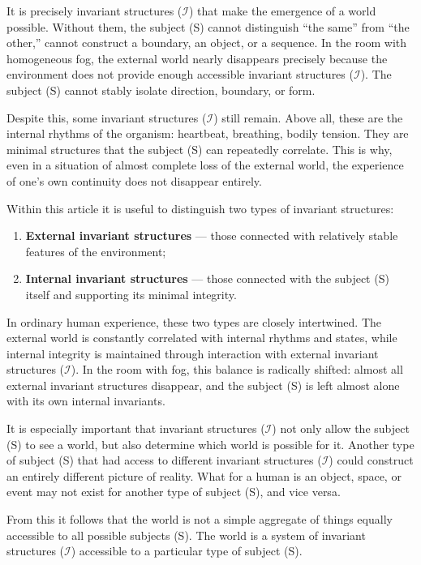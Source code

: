 \documentclass[aps,prd,onecolumn,nofootinbib,superscriptaddress]{revtex4-2} %
\begin{document}
    It is precisely invariant structures ($\mathcal{I}$) that make the emergence of a world possible. Without them, the subject (S) cannot distinguish “the same” from “the other,” cannot construct a boundary, an object, or a sequence. In the room with homogeneous fog, the external world nearly disappears precisely because the environment does not provide enough accessible invariant structures ($\mathcal{I}$). The subject (S) cannot stably isolate direction, boundary, or form.

    Despite this, some invariant structures ($\mathcal{I}$) still remain. Above all, these are the internal rhythms of the organism: heartbeat, breathing, bodily tension. They are minimal structures that the subject (S) can repeatedly correlate. This is why, even in a situation of almost complete loss of the external world, the experience of one’s own continuity does not disappear entirely.

    Within this article it is useful to distinguish two types of invariant structures:

    \begin{enumerate}
        \item \textbf{External invariant structures} --- those connected with relatively stable features of the environment;

        \item \textbf{Internal invariant structures} --- those connected with the subject (S) itself and supporting its minimal integrity.
    \end{enumerate}

    In ordinary human experience, these two types are closely intertwined. The external world is constantly correlated with internal rhythms and states, while internal integrity is maintained through interaction with external invariant structures ($\mathcal{I}$). In the room with fog, this balance is radically shifted: almost all external invariant structures disappear, and the subject (S) is left almost alone with its own internal invariants.

    It is especially important that invariant structures ($\mathcal{I}$) not only allow the subject (S) to see a world, but also determine which world is possible for it. Another type of subject (S) that had access to different invariant structures ($\mathcal{I}$) could construct an entirely different picture of reality. What for a human is an object, space, or event may not exist for another type of subject (S), and vice versa.

    From this it follows that the world is not a simple aggregate of things equally accessible to all possible subjects (S). The world is a system of invariant structures ($\mathcal{I}$) accessible to a particular type of subject (S).
\end{document}
